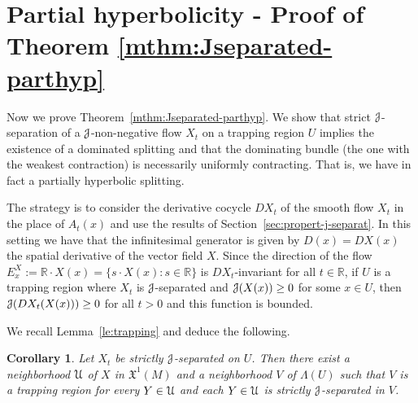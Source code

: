 \documentclass[12pt,reqno]{amsart}
\numberwithin{equation}{section}
\theoremstyle{plain}
\newtheorem{corollary}[theorem]{Corollary}
\theoremstyle{definition}
\newtheorem{remark}[theorem]{Remark}
\newcommand{\RR}{{\mathbb R}}
\newcommand{\U}{\EuScript{U}}
\newcommand{\J}{\EuScript{J}}
\newcommand{\Mundo}{\mathfrak{X}^{1}(M)}
\begin{document}


\section{Partial hyperbolicity - Proof of Theorem \ref{mthm:Jseparated-parthyp}}
\label{sec:strict-j-separat}

Now we prove Theorem~\ref{mthm:Jseparated-parthyp}. We show
that strict $\J$-separation of a $\J$-non-negative flow
$X_t$ on a trapping region $U$ implies the existence of a
dominated splitting and that the dominating bundle (the one
with the weakest contraction) is necessarily uniformly
contracting. That is, we have in fact a partially hyperbolic
splitting.

The strategy is to consider the derivative cocycle $DX_t$ of
the smooth flow $X_t$ in the place of $A_t(x)$ and use the
results of Section~\ref{sec:propert-j-separat}. In this
setting we have that the infinitesimal generator is given by
$D(x)=DX(x)$ the spatial derivative of the vector field
$X$. Since the direction of the flow $E^X_x:=\RR\cdot X(x) =
\{ s\cdot X(x): s\in\RR\}$ is $DX_t$-invariant for all $t\in\RR$, if $U$ is a
trapping region where $X_t$ is
$\J$-separated and $\J(X(x))\ge0$ for some $x\in U$, then
$\J(DX_t(X(x)))\ge0$ for all $t>0$ and this function is
bounded. %


We recall Lemma~\ref{le:trapping} and deduce the following.

\begin{corollary}
  \label{cor:persistence}
  Let $X_t$ be strictly $\J$-separated on $U$.
  Then there exist a neighborhood $\U$ of $X$ in
  $\Mundo$ and a neighborhood $V$ of $\Lambda(U)$ such
  that $V$ is a trapping region for every $Y\in\U$ and
  each $Y\in\U$ is strictly $\J$-separated in $V$.
\end{corollary}
\end{document}
